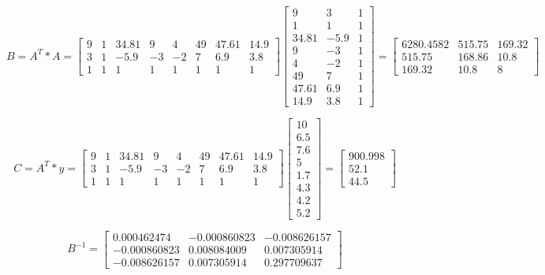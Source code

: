 \documentclass[a4paper,norsk]{article}
\begin{document}
\begin{equation*}
B = A^{T} * A = \begin{bmatrix} 9 & 1 & 34.81 & 9 & 4 & 49 & 47.61 & 14.9 \\  3 & 1 & -5.9 & -3 & -2 & 7 & 6.9 & 3.8 \\1 & 1 & 1 & 1& 1 & 1 & 1 & 1\end{bmatrix}
\begin{bmatrix}  9 & 3 & 1 \\ 1 & 1 & 1 \\ 34.81 & -5.9 & 1 \\  9 & -3 & 1 \\4 & -2 & 1  \\49 & 7 & 1 \\47.61 & 6.9 & 1 \\ 14.9 & 3.8 & 1\end{bmatrix}
=\begin{bmatrix} 6280.4582 & 515.75 & 169.32 \\ 515.75 & 168.86 & 10.8 \\ 169.32 & 10.8 & 8\end{bmatrix}
\end{equation*} 


\begin{equation*}
C = A^{T} * y = \begin{bmatrix} 9 & 1 & 34.81 & 9 & 4 & 49 & 47.61 & 14.9 \\  3 & 1 & -5.9 & -3 & -2 & 7 & 6.9 & 3.8 \\1 & 1 & 1 & 1& 1 & 1 & 1 & 1 \end{bmatrix}
\begin{bmatrix}10 \\ 6.5\\7.6\\5\\1.7\\4.3\\4.2\\5.2\end{bmatrix}
=\begin{bmatrix}900.998 \\52.1 \\44.5 \end{bmatrix}
\end{equation*}

\begin{equation*}
B^{-1} = \begin{bmatrix} 0.000462474 & -0.000860823 & -0.008626157\\ -0.000860823 & 0.008084009 & 0.007305914 \\-0.008626157 & 0.007305914 & 0.297709637  \end{bmatrix}
\end{equation*}
\end{document}
